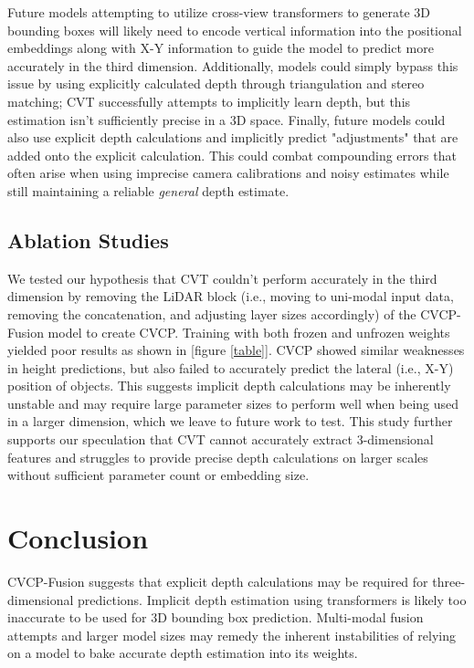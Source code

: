 \documentclass[a4paper,12pt]{article}
\begin{document}
\begin{multicols}{2}
Future models attempting to utilize cross-view transformers to generate 3D bounding boxes will likely need to encode vertical information into the positional embeddings along with X-Y information to guide the model to predict more accurately in the third dimension. Additionally, models could simply bypass this issue by using explicitly calculated depth through triangulation and stereo matching; CVT successfully attempts to implicitly learn depth, but this estimation isn't sufficiently precise in a 3D space. Finally, future models could also use explicit depth calculations and implicitly predict "adjustments" that are added onto the explicit calculation. This could combat compounding errors that often arise when using imprecise camera calibrations and noisy estimates while still maintaining a reliable \textit{general} depth estimate.

\subsection{Ablation Studies}
We tested our hypothesis that CVT couldn't perform accurately in the third dimension by removing the LiDAR block (i.e., moving to uni-modal input data, removing the concatenation, and adjusting layer sizes accordingly) of the CVCP-Fusion model to create CVCP. Training with both frozen and unfrozen weights yielded poor results as shown in [figure \ref{table}]. CVCP showed similar weaknesses in height predictions, but also failed to accurately predict the lateral (i.e., X-Y) position of objects. This suggests implicit depth calculations may be inherently unstable and may require large parameter sizes to perform well when being used in a larger dimension, which we leave to future work to test. This study further supports our speculation that CVT cannot accurately extract 3-dimensional features and struggles to provide precise depth calculations on larger scales without sufficient parameter count or embedding size.

\section{Conclusion}
CVCP-Fusion suggests that explicit depth calculations may be required for three-dimensional predictions. Implicit depth estimation using transformers is likely too inaccurate to be used for 3D bounding box prediction. Multi-modal fusion attempts and larger model sizes may remedy the inherent instabilities of relying on a model to bake accurate depth estimation into its weights.



\end{multicols}
\end{document}

